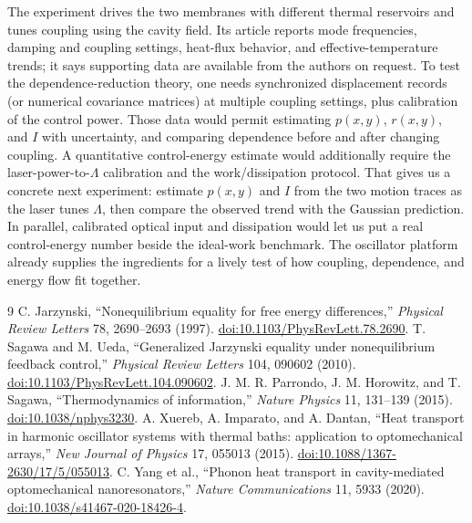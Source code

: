 \documentclass[9pt]{article}
\begin{document}
The experiment drives the two membranes with different thermal reservoirs and tunes coupling using the cavity field. Its article reports mode frequencies, damping and coupling settings, heat-flux behavior, and effective-temperature trends; it says supporting data are available from the authors on request. To test the dependence-reduction theory, one needs synchronized displacement records (or numerical covariance matrices) at multiple coupling settings, plus calibration of the control power. Those data would permit estimating $p(x,y)$, $r(x,y)$, and $I$ with uncertainty, and comparing dependence before and after changing coupling. A quantitative control-energy estimate would additionally require the laser-power-to-$\Lambda$ calibration and the work/dissipation protocol. That gives us a concrete next experiment: estimate $p(x,y)$ and $I$ from the two motion traces as the laser tunes $\Lambda$, then compare the observed trend with the Gaussian prediction. In parallel, calibrated optical input and dissipation would let us put a real control-energy number beside the ideal-work benchmark. The oscillator platform already supplies the ingredients for a lively test of how coupling, dependence, and energy flow fit together.
\begin{thebibliography}{9}
 C. Jarzynski, ``Nonequilibrium equality for free energy differences,'' \emph{Physical Review Letters} 78, 2690--2693 (1997). \href{https://doi.org/10.1103/PhysRevLett.78.2690}{doi:10.1103/PhysRevLett.78.2690}.
 T. Sagawa and M. Ueda, ``Generalized Jarzynski equality under nonequilibrium feedback control,'' \emph{Physical Review Letters} 104, 090602 (2010). \href{https://doi.org/10.1103/PhysRevLett.104.090602}{doi:10.1103/PhysRevLett.104.090602}.
 J. M. R. Parrondo, J. M. Horowitz, and T. Sagawa, ``Thermodynamics of information,'' \emph{Nature Physics} 11, 131--139 (2015). \href{https://doi.org/10.1038/nphys3230}{doi:10.1038/nphys3230}.
 A. Xuereb, A. Imparato, and A. Dantan, ``Heat transport in harmonic oscillator systems with thermal baths: application to optomechanical arrays,'' \emph{New Journal of Physics} 17, 055013 (2015). \href{https://doi.org/10.1088/1367-2630/17/5/055013}{doi:10.1088/1367-2630/17/5/055013}.
 C. Yang et al., ``Phonon heat transport in cavity-mediated optomechanical nanoresonators,'' \emph{Nature Communications} 11, 5933 (2020). \href{https://doi.org/10.1038/s41467-020-18426-4}{doi:10.1038/s41467-020-18426-4}.
\end{thebibliography}
\end{document}
